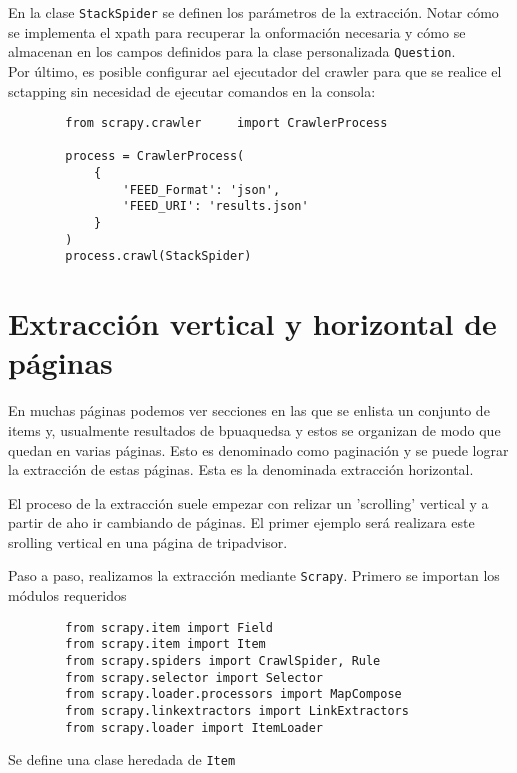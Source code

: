     En la clase \texttt{StackSpider} se definen los parámetros de la extracción. Notar cómo se implementa el xpath para recuperar la onformación necesaria y cómo se almacenan en los campos definidos para la clase personalizada \texttt{Question}. \\

    Por último, es posible configurar ael ejecutador del crawler para que se realice el sctapping sin necesidad de ejecutar comandos en la consola:

    \begin{verbatim}
        from scrapy.crawler     import CrawlerProcess
                       
        process = CrawlerProcess(
            {
                'FEED_Format': 'json',
                'FEED_URI': 'results.json'
            }
        )
        process.crawl(StackSpider)
    \end{verbatim}

    \section{Extracción vertical y horizontal de páginas}

        En muchas páginas podemos ver secciones en las que se enlista un conjunto de items y, usualmente resultados de bpuaquedsa y estos se organizan de modo que quedan en varias páginas. Esto es denominado como paginación y se puede lograr la extracción de estas páginas. Esta es la denominada extracción horizontal.

        El proceso de la extracción suele empezar con relizar un 'scrolling' vertical y a partir de aho ir cambiando de páginas. El primer ejemplo será realizara este srolling vertical en una página de tripadvisor.

        Paso a paso, realizamos la extracción mediante \texttt{Scrapy}. Primero se importan los módulos requeridos

        \begin{verbatim}
        from scrapy.item import Field
        from scrapy.item import Item
        from scrapy.spiders import CrawlSpider, Rule
        from scrapy.selector import Selector
        from scrapy.loader.processors import MapCompose
        from scrapy.linkextractors import LinkExtractors
        from scrapy.loader import ItemLoader        
        \end{verbatim}

        Se define una clase heredada de \texttt{Item}

